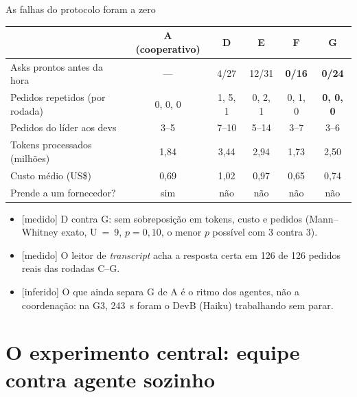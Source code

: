 \documentclass[11pt,aspectratio=169]{beamer}
\newcommand{\ev}[2]{{\scriptsize\sffamily\colorbox{#1!12}{\textcolor{#1!80!black}{[#2]}}}}
\newcommand{\medido}{\ev{ok}{medido}}
\newcommand{\inferido}{\ev{alerta}{inferido}}
\begin{document}
\begin{frame}{As falhas do protocolo foram a zero}
\small
\begin{tabular}{@{}l c c c c c@{}}
\toprule
& A (cooperativo) & D & E & F & G \\
\midrule
Asks prontos antes da hora & --- & 4/27 & 12/31 & \textcolor{ok}{\textbf{0/16}} & \textcolor{ok}{\textbf{0/24}} \\
Pedidos repetidos (por rodada) & 0, 0, 0 & 1, 5, 1 & 0, 2, 1 & 0, 1, 0 & \textcolor{ok}{\textbf{0, 0, 0}} \\
Pedidos do líder aos devs & 3--5 & 7--10 & 5--14 & 3--7 & 3--6 \\
Tokens processados (milhões) & 1,84 & 3,44 & 2,94 & 1,73 & 2,50 \\
Custo médio (US\$) & 0,69 & 1,02 & 0,97 & 0,65 & 0,74 \\
Prende a um fornecedor? & \textcolor{ruim}{sim} & não & não & não & não \\
\bottomrule
\end{tabular}
\vspace{0.8em}

\begin{itemize}\setlength\itemsep{0.3em}
\item \medido{} D contra G: sem sobreposição em tokens, custo e pedidos (Mann--Whitney exato, U~=~9, $p = 0{,}10$, o
  menor $p$ possível com 3 contra 3).
\item \medido{} O leitor de \emph{transcript} acha a resposta certa em 126 de 126 pedidos reais das rodadas C--G.
\item \inferido{} O que ainda separa G de A é o ritmo dos agentes, não a coordenação: na G3, 243~s foram o DevB (Haiku)
  trabalhando sem parar.
\end{itemize}
\end{frame}

\section{O experimento central: equipe contra agente sozinho}
\end{document}
